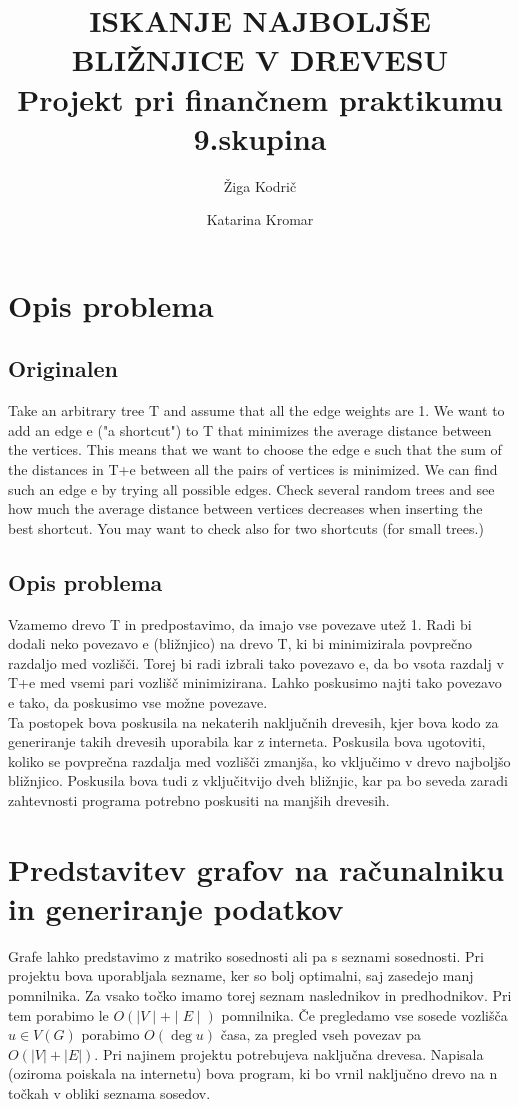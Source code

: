 \documentclass[a4paper,10pt]{article}
\begin{document}
\title{ ISKANJE NAJBOLJŠE BLIŽNJICE V DREVESU \\ \large Projekt pri finančnem praktikumu \\ 9.skupina}
\author{Žiga Kodrič \and Katarina Kromar}
\maketitle

\section{Opis problema}
\subsection{Originalen}
Take an arbitrary tree T and assume that all the edge weights are 1. We want to add an edge e ("a shortcut") to T that minimizes the average distance between the vertices. This means that we want to choose the edge e such that the sum of the distances in T+e between all the pairs of vertices is minimized. We can find such an edge e by trying all possible edges. Check several random trees and see how much the average distance between vertices decreases when inserting the best shortcut. You may want to check also for two shortcuts (for small trees.)

\subsection{Opis problema}
Vzamemo drevo T in predpostavimo, da imajo vse povezave utež 1. Radi bi dodali neko povezavo e (bližnjico) na drevo T, ki bi minimizirala povprečno razdaljo med vozlišči. Torej bi radi izbrali tako povezavo e, da bo vsota razdalj v T+e med vsemi pari vozlišč minimizirana. Lahko poskusimo najti tako povezavo e tako, da poskusimo vse možne povezave. 
\\[1cm]
Ta postopek bova poskusila na nekaterih naključnih drevesih, kjer bova kodo za generiranje takih drevesih uporabila kar z interneta. Poskusila bova ugotoviti, koliko se povprečna razdalja med vozlišči zmanjša, ko vključimo v drevo najboljšo bližnjico. Poskusila bova tudi z vključitvijo dveh bližnjic, kar pa bo seveda zaradi zahtevnosti programa potrebno poskusiti na manjših drevesih.

\section{Predstavitev grafov na računalniku in generiranje podatkov}
Grafe lahko predstavimo z matriko sosednosti ali pa s seznami sosednosti. Pri projektu bova uporabljala sezname, ker so bolj optimalni, saj zasedejo manj pomnilnika. Za vsako točko imamo torej seznam naslednikov in predhodnikov. Pri tem porabimo le $O(\mid V \mid + \mid E \mid)$ pomnilnika.
Če pregledamo vse sosede vozlišča $ u \in  V(G) $  porabimo $ O(\deg u)$ časa, za pregled vseh povezav pa $O(|V|+|E|)$.
Pri najinem projektu potrebujeva naključna drevesa. Napisala (oziroma poiskala na internetu) bova program, ki bo vrnil naključno drevo na n točkah v obliki seznama sosedov.
\end{document}

